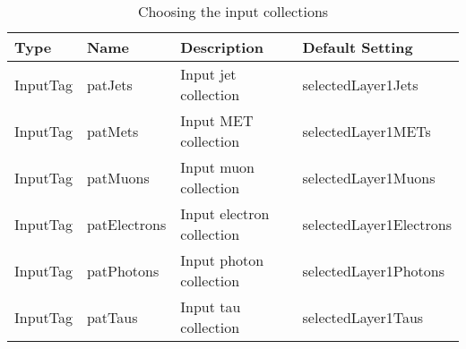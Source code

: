 \documentclass{cmspaper}
\begin{document}
\begin{appendix}
\begin{table}[h]
\caption{Choosing the input collections}
\begin{center}
\begin{tabular}{l|l|l|l}
\textbf{Type} & \textbf{Name} & \textbf{Description} & \textbf{Default
Setting} \\ \hline
InputTag & patJets      & Input jet collection   & selectedLayer1Jets
\\\hline
InputTag & patMets      & Input MET collection   & selectedLayer1METs
\\\hline
InputTag & patMuons     & Input muon collection  & selectedLayer1Muons
\\\hline
InputTag & patElectrons & Input electron collection &
selectedLayer1Electrons 
\\\hline
InputTag & patPhotons   & Input photon collection& selectedLayer1Photons
\\\hline
InputTag & patTaus      & Input tau collection   & selectedLayer1Taus
\end{tabular}
\end{center}
\label{tab:InputCollections}
\end{table}


\end{appendix}
\end{document}
